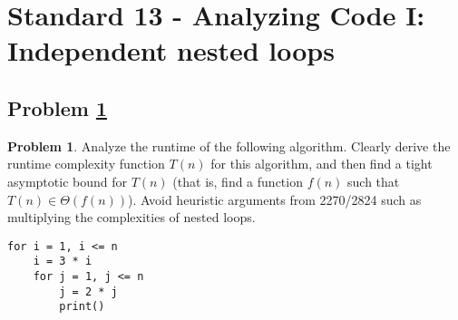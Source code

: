 \documentclass[11pt]{article}
\theoremstyle{definition}
\theoremstyle{definition}
\newtheorem{required}{Problem}
\theoremstyle{definition}
\begin{document}
\section{Standard 13 - Analyzing Code I: Independent nested loops}
\subsection{Problem \ref{prob}}\begin{required}\label{prob}
Analyze the runtime of the following algorithm. Clearly derive the runtime complexity function $T(n)$ for this algorithm, and then find a tight asymptotic bound for $T(n)$ (that is, find a function $f(n)$ such that $T(n) \in \Theta(f(n))$). Avoid heuristic arguments from 2270/2824 such as multiplying the complexities of nested loops.


\begin{verbatim}
for i = 1, i <= n
    i = 3 * i
    for j = 1, j <= n
        j = 2 * j
        print()
\end{verbatim}


\end{required}

\end{document}

